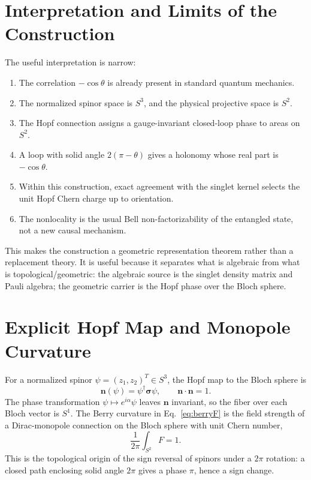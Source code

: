 \documentclass[
  aps,
  pra,
  reprint,
  superscriptaddress,
  nofootinbib,
  longbibliography,
  floatfix,
  amsmath,
  amssymb
]{revtex4-2}
\theoremstyle{plain}
\theoremstyle{definition}
\theoremstyle{remark}
\newcommand{\Pauli}{\boldsymbol{\sigma}}
\begin{document}
\section{Interpretation and Limits of the Construction}
\label{sec:interpretation}

The useful interpretation is narrow:
\begin{enumerate}
\item The correlation \(-\cos\theta\) is already present in standard quantum mechanics.
\item The normalized spinor space is \(S^3\), and the physical projective space is \(S^2\).
\item The Hopf connection assigns a gauge-invariant closed-loop phase to areas on \(S^2\).
\item A loop with solid angle \(2(\pi-\theta)\) gives a holonomy whose real part is \(-\cos\theta\).
\item Within this construction, exact agreement with the singlet kernel selects the unit Hopf Chern charge up to orientation.
\item The nonlocality is the usual Bell non-factorizability of the entangled state, not a new causal mechanism.
\end{enumerate}

This makes the construction a geometric representation theorem rather than a replacement theory.  It is useful because it separates what is algebraic from what is topological/geometric: the algebraic source is the singlet density matrix and Pauli algebra; the geometric carrier is the Hopf phase over the Bloch sphere.


\section{Explicit Hopf Map and Monopole Curvature}
\label{sec:hopfmap}

For a normalized spinor \(\psi=(z_1,z_2)^T\in S^3\), the Hopf map to the Bloch sphere is
\begin{equation}
\bm n(\psi)=\psi^\dagger\Pauli\psi,
\qquad
\bm n\cdot\bm n=1.
\end{equation}
The phase transformation \(\psi\mapsto e^{i\alpha}\psi\) leaves \(\bm n\) invariant, so the fiber over each Bloch vector is \(S^1\).  The Berry curvature in Eq.~\eqref{eq:berryF} is the field strength of a Dirac-monopole connection on the Bloch sphere with unit Chern number,
\begin{equation}
\frac{1}{2\pi}\int_{S^2}F=1.
\end{equation}
This is the topological origin of the sign reversal of spinors under a \(2\pi\) rotation: a closed path enclosing solid angle \(2\pi\) gives a phase \(\pi\), hence a sign change.
\end{document}
